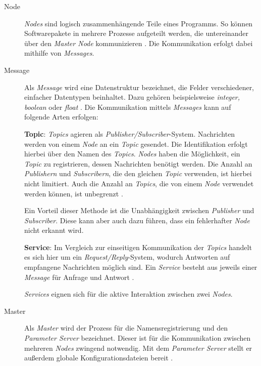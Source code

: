 \begin{description}
    \item[Node] \textit{Nodes} sind logisch zusammenhängende Teile eines Programms. So können Softwarepakete in mehrere Prozesse aufgeteilt werden, die untereinander über den \textit{Master Node} kommunizieren \cite[Absatz~2]{romero_rosconcepts_2014}. Die Kommunikation erfolgt dabei mithilfe von \textit{Messages}.
    \item[Message] Als \textit{Message} wird eine Datenstruktur bezeichnet, die Felder verschiedener, einfacher Datentypen beinhaltet. Dazu gehören beispielsweise \textit{integer, boolean} oder \textit{float} \cite[Absatz~2]{romero_rosconcepts_2014}. Die Kommunikation mittels \textit{Messages} kann auf folgende Arten erfolgen:

        \textbf{Topic}: \textit{Topics} agieren als \textit{Publisher/Subscriber}-System. Nachrichten werden von einem \textit{Node} an ein \textit{Topic} gesendet. Die Identifikation erfolgt hierbei über den Namen des \textit{Topics}. \textit{Nodes} haben die Möglichkeit, ein \textit{Topic} zu registrieren, dessen Nachrichten benötigt werden. Die Anzahl an \textit{Publishern} und \textit{Subscribern}, die den gleichen \textit{Topic} verwenden, ist hierbei nicht limitiert. Auch die Anzahl an \textit{Topics}, die von einem \textit{Node} verwendet werden können, ist unbegrenzt \cite[Absatz~2]{romero_rosconcepts_2014}.
        
        Ein Vorteil dieser Methode ist die Unabhängigkeit zwischen \textit{Publisher} und \textit{Subscriber}. Diese kann aber auch dazu führen, dass ein fehlerhafter \textit{Node} nicht erkannt wird.
        
        \textbf{Service}: Im Vergleich zur einseitigen Kommunikation der \textit{Topics} handelt es sich hier um ein \textit{Request/Reply}-System, wodurch Antworten auf empfangene Nachrichten möglich sind. Ein \textit{Service} besteht aus jeweils einer \textit{Message} für Anfrage und Antwort \cite[Absatz~2]{romero_rosconcepts_2014}.
        
        \textit{Services} eignen sich für die aktive Interaktion zwischen zwei \textit{Nodes}.

    \item[Master] Als \textit{Master} wird der Prozess für die Namensregistrierung und den \textit{Parameter Server} bezeichnet. Dieser ist für die Kommunikation zwischen mehreren \textit{Nodes} zwingend notwendig. Mit dem \textit{Parameter Server} stellt er außerdem globale Konfigurationsdateien bereit \cite[Absatz~2]{romero_rosconcepts_2014}.
\end{description}

